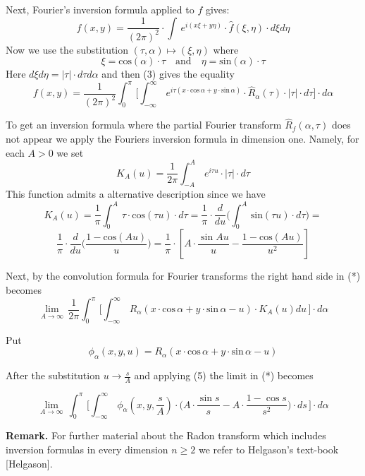 \noindent
Next, Fourier's inversion formula applied to $f$ gives:
\[
f(x,y)=\frac{1}{(2\pi)^2}\cdot
\int\, e^{i(x\xi+y\eta)}\cdot
\widehat f(\xi,\eta)\cdot d\xi d\eta
\]
Now we use the substitution
$(\tau,\alpha)\mapsto (\xi,\eta)$ where
\[ 
\xi=\text{cos}(\alpha)\cdot \tau\quad\text{and}\quad
\eta=\text{sin}(\alpha)\cdot \tau
\]
Here $d\xi d\eta=|\tau|\cdot d\tau d\alpha$ and then
(3) gives
the equality
\[
f(x,y)=
\frac{1}{(2\pi)^2}\int_0^\pi\,\bigl[
\int_{-\infty}^\infty\,
e^{i\tau(x\cdot \text{cos}\,\alpha+
y\cdot \text{sin}\,\alpha)}
\cdot \widehat R_\alpha(\tau)\cdot |\tau|\cdot d\tau\bigr]\cdot d\alpha\tag{*}
\]
\medskip

\noindent
To get an inversion formula  where 
the partial Fourier transform
$\widehat R_f(\alpha,\tau)$
does not appear we  apply the Fouriers inversion formula in
dimension one. Namely, for each $A>0$ we set
\[ 
K_A(u)=
\frac{1}{2\pi}
\int_{-A}^A\,
e^{i\tau u}\cdot |\tau|\cdot d\tau\tag{4}
\]
This function admits a alternative
description since we have
\[
K_A(u)=
\frac{1}{\pi}
\int_0^A\,
\tau\cdot \text{cos}(\tau u)\cdot d\tau=
\frac{1}{\pi}\cdot \frac{d}{du}\bigl(
\int_0^A\,
\text{sin}(\tau u) \cdot d\tau\bigr)=
\]
\[
\frac{1}{\pi}\cdot \frac{d}{du}\bigl(
\frac{1-\text{cos}(Au)}{u}\bigr)=
\frac{1}{\pi}\cdot [A\cdot \frac{\sin Au}{u}-\frac{1-\text{cos}(Au)}{u^2}]\tag{5}
\]
\medskip

\noindent
Next, 
by the convolution formula for Fourier transforms
the right hand side in (*) becomes
\[
\lim_{A\to\infty}\,
\frac{1}{2\pi}\int_0^\pi\,\bigl[
\int_{-\infty}^\infty\,
R_\alpha(
x\cdot \text{cos}\,\alpha+
y\cdot \text{sin}\,\alpha-u)\cdot K_A(u) du\,\bigr]
\cdot d\alpha\tag{6}
\]

\medskip


\noindent
Put
\[ 
\phi_\alpha(x,y,u)=R_\alpha(
x\cdot \text{cos}\,\alpha+
y\cdot \text{sin}\,\alpha-u)\tag{7}
\]


\noindent
After the substitution
$u\to \frac{s}{A}$ and applying (5) 
the limit in (*) becomes

\[ 
\lim_{A\to\infty}\,
\int_0^\pi\,\bigl[\int_{-\infty}^\infty\, \phi_\alpha(x,y,\frac {s}{A})\cdot \bigl(
A\cdot \frac{\sin s}{s}-
A\cdot \frac{1-\cos s}{s^2}\bigr)\cdot ds\,\bigr ] \cdot d\alpha\tag{**}
\]

\bigskip


\noindent
{\bf{Remark.}}
For further material about the Radon transform
which includes inversion formulas in
every dimension $n\geq 2$ we refer to Helgason's text-book [Helgason].

